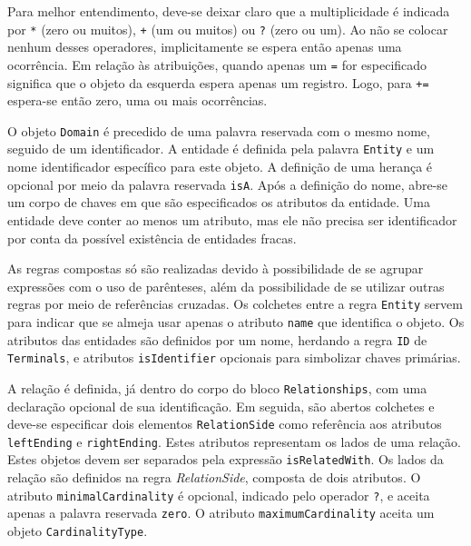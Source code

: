 Para melhor entendimento, deve-se deixar claro que a multiplicidade é indicada por \texttt{*} (zero ou muitos), \texttt{+} (um ou muitos) ou \texttt{?} (zero ou um). 
Ao não se colocar nenhum desses operadores, implicitamente se espera então apenas uma ocorrência. 
Em relação às atribuições, quando apenas um \texttt{=} for especificado significa que o objeto da esquerda espera apenas um registro. 
Logo, para \texttt{+=} espera-se então zero, uma ou mais ocorrências. 

O objeto \texttt{Domain} é precedido de uma palavra reservada com o mesmo nome, seguido de um identificador. 
A entidade é definida pela palavra \texttt{Entity} e um nome identificador específico para este objeto. 
A definição de uma herança é opcional por meio da palavra reservada \texttt{isA}. 
Após a definição do nome, abre-se um corpo de chaves em que são especificados os atributos da entidade. 
Uma entidade deve conter ao menos um atributo, mas ele não precisa ser identificador por conta da possível existência de entidades fracas. 

As regras compostas só são realizadas devido à possibilidade de se agrupar expressões com o uso de parênteses, além da possibilidade de se utilizar outras regras por meio de referências cruzadas. 
Os colchetes entre a regra \texttt{Entity} servem para indicar que se almeja usar apenas o atributo \texttt{name} que identifica o objeto. 
Os atributos das entidades são definidos por um nome, herdando a regra \texttt{ID} de \texttt{Terminals}, e atributos \texttt{isIdentifier} opcionais para simbolizar chaves primárias. 

A relação é definida, já dentro do corpo do bloco \texttt{Relationships}, com uma declaração opcional de sua identificação. 
Em seguida, são abertos colchetes e deve-se especificar dois elementos \texttt{RelationSide} como referência aos atributos \texttt{leftEnding} e \texttt{rightEnding}. 
Estes atributos representam os lados de uma relação. 
Estes objetos devem ser separados pela expressão \texttt{isRelatedWith}. 
Os lados da relação são definidos na regra \textit{RelationSide}, composta de dois atributos. 
O atributo \texttt{minimalCardinality} é opcional, indicado pelo operador \texttt{?}, e aceita apenas a palavra reservada \texttt{zero}. 
O atributo \texttt{maximumCardinality} aceita um objeto \texttt{CardinalityType}.

